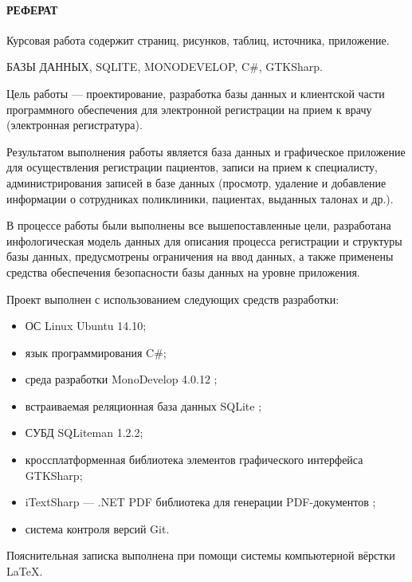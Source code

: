 \newpage
{}
\paragraph{\hfill РЕФЕРАТ \hfill}
Курсовая работа содержит  страниц,  рисунков,  таблиц,  источника,  приложение.

БАЗЫ ДАННЫХ, SQLITE, MONODEVELOP, C\#, GTKSharp.

Цель работы --- проектирование, разработка базы данных и клиентской части программного обеспечения для электронной регистрации на прием к врачу (электронная регистратура).

Результатом выполнения работы является база данных и графическое приложение для осуществления регистрации пациентов, записи на прием к специалисту, администрирования записей в базе данных (просмотр, удаление и добавление информации о сотрудниках поликлиники, пациентах, выданных талонах и др.).

В процессе работы были выполнены все вышепоставленные цели, разработана инфологическая модель данных для описания процесса регистрации и структуры базы данных, предусмотрены ограничения на ввод данных, а также применены средства обеспечения безопасности базы данных на уровне приложения.

Проект выполнен с использованием следующих средств разработки:
\begin{itemize}
  \item ОС Linux Ubuntu 14.10;
  \item язык программирования C\#;
  \item среда разработки MonoDevelop 4.0.12 \cite{monodoc};
  \item встраиваемая реляционная база данных SQLite \cite{sqlitedoc};
  \item СУБД SQLiteman 1.2.2;
  \item кроссплатформенная библиотека элементов графического интерфейса GTKSharp;
  \item iTextSharp --- .NET PDF библиотека для генерации PDF-документов \cite{itextsharp};
  \item система контроля версий Git.
\end{itemize}

Пояснительная записка выполнена при помощи системы компьютерной вёрстки \LaTeX.
